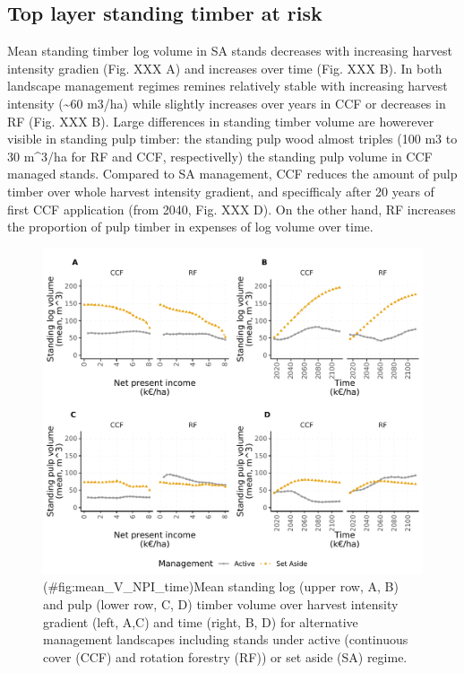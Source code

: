 \documentclass[]{elsarticle} %
\begin{document}
\hypertarget{top-layer-standing-timber-at-risk}{%
\subsection{Top layer standing timber at risk}\label{top-layer-standing-timber-at-risk}}

Mean standing timber log volume in SA stands decreases with increasing harvest intensity gradien (Fig. XXX A) and increases over time (Fig. XXX B). In both landscape management regimes remines relatively stable with increasing harvest intensity (\textasciitilde60 m3/ha) while slightly increases over years in CCF or decreases in RF (Fig. XXX B). Large differences in standing timber volume are howerever visible in standing pulp timber: the standing pulp wood almost triples (100 m3 to 30 m\^{}3/ha for RF and CCF, respectivelly) the standing pulp volume in CCF managed stands. Compared to SA management, CCF reduces the amount of pulp timber over whole harvest intensity gradient, and specifficaly after 20 years of first CCF application (from 2040, Fig. XXX D). On the other hand, RF increases the proportion of pulp timber in expenses of log volume over time.

\begin{figure}
\centering
\includegraphics{test_manus4_puhti_files/figure-latex/mean_V_NPI_time-1.pdf}
\caption{(\#fig:mean\_V\_NPI\_time)Mean standing log (upper row, A, B) and pulp (lower row, C, D) timber volume over harvest intensity gradient (left, A,C) and time (right, B, D) for alternative management landscapes including stands under active (continuous cover (CCF) and rotation forestry (RF)) or set aside (SA) regime.}
\end{figure}
\end{document}
